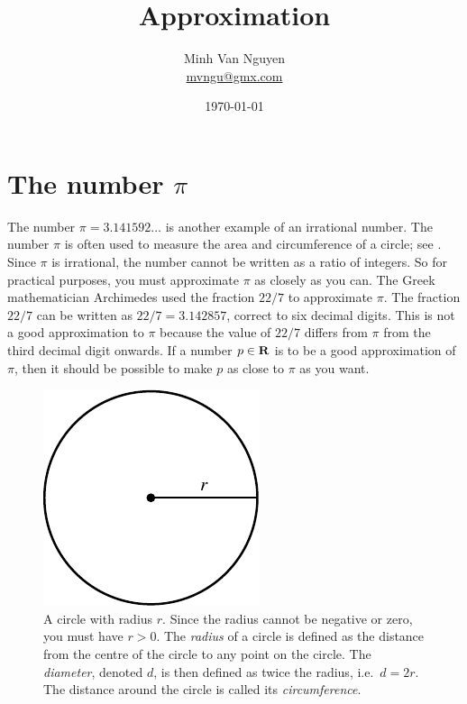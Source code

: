 \documentclass[a4paper,oneside,12pt]{article}
\begin{document}
\title{\Large\bf Approximation}
\author{%
  Minh Van Nguyen \\
  \url{mvngu@gmx.com}
}
\date{\today}
\maketitle


\section{The number $\pi$}

The number $\pi = 3.141592\dots$ is another example of an irrational
number.  The number $\pi$ is often used to measure the area and
circumference of a circle; see .  Since
$\pi$ is irrational, the number cannot be written as a ratio of
integers.  So for practical purposes, you must approximate $\pi$ as
closely as you can.  The Greek mathematician Archimedes used the
fraction $22 / 7$ to approximate $\pi$.  The fraction $22 / 7$ can be
written as $22 / 7 = 3.142857$, correct to six decimal digits.  This
is not a good approximation to $\pi$ because the value of $22 / 7$
differs from $\pi$ from the third decimal digit onwards.  If a number
$p \in \mathbf{R}$ is to be a good approximation of $\pi$, then it should be
possible to make $p$ as close to $\pi$ as you want.

\begin{figure}[!htbp]
\centering
\includegraphics[scale=1]{image/03/circle.pdf}
\caption{%
  A circle with radius $r$.  Since the radius cannot be negative or
  zero, you must have $r > 0$.  The \emph{radius} of a circle is
  defined as the distance from the centre of the circle to any point
  on the circle.  The \emph{diameter}, denoted $d$, is then defined as
  twice the radius, i.e.~$d = 2r$.  The distance around the circle is
  called its \emph{circumference}.
}
\label{fig:general_circle}
\end{figure}
\end{document}
